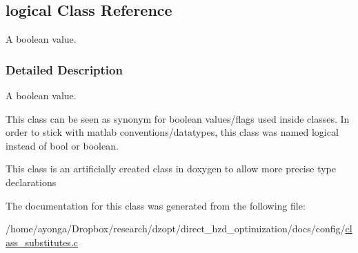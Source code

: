 \hypertarget{classlogical}{}\subsection{logical Class Reference}
\label{classlogical}


A boolean value.  




\subsubsection{Detailed Description}
A boolean value. 

This class can be seen as synonym for boolean values/flags used inside classes. In order to stick with matlab conventions/datatypes, this class was named logical instead of bool or boolean.

This class is an artificially created class in doxygen to allow more precise type declarations 

The documentation for this class was generated from the following file\+:\begin{DoxyCompactItemize}
\item 
/home/ayonga/\+Dropbox/research/dzopt/direct\+\_\+hzd\+\_\+optimization/docs/config/\hyperlink{class__substitutes_8c}{class\+\_\+substitutes.\+c}\end{DoxyCompactItemize}
